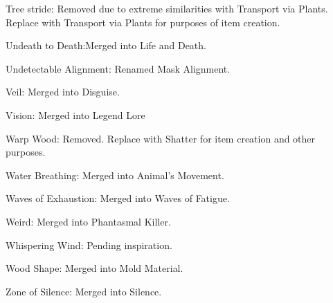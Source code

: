{\begin{list}{}{\leftmargin=1em}
 \item Tree stride: Removed due to extreme similarities with Transport via Plants. Replace with Transport via Plants for purposes of item creation.
 \item Undeath to Death:Merged into Life and Death.
 \item Undetectable Alignment: Renamed Mask Alignment.
 \item Veil: Merged into Disguise.
 \item Vision: Merged into Legend Lore
 \item Warp Wood: Removed. Replace with Shatter for item creation and other purposes.
 \item Water Breathing: Merged into Animal's Movement.
 \item Waves of Exhaustion: Merged into Waves of Fatigue.
 \item Weird: Merged into Phantasmal Killer.
 \item Whispering Wind: Pending inspiration.
 \item Wood Shape: Merged into Mold Material.
 \item Zone of Silence: Merged into Silence.
\end{list}}

